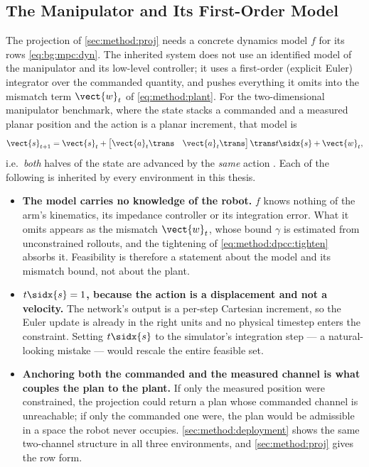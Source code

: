 \subsection{The Manipulator and Its First-Order Model}\label{sec:method:manipulator}

The projection of \autoref{sec:method:proj} needs a concrete dynamics model $f$ for its rows
\eqref{eq:bg:mpc:dyn}. The inherited system does not use an identified
model of the manipulator and its low-level controller; it uses a first-order (explicit Euler)
integrator over the commanded quantity, and pushes everything it omits into the mismatch term
$\vect{w}_{t}$ of \eqref{eq:method:plant}. For the two-dimensional manipulator benchmark, where the
state stacks a commanded and a measured planar position and the action is a planar increment, that
model is
\begin{equation}\label{eq:method:dpcc:euler}
  \vect{s}_{t+1}
  = \vect{s}_{t} + \begin{bmatrix}\vect{a}_{t}\trans & \vect{a}_{t}\trans\end{bmatrix}\trans t\sidx{s}
    + \vect{w}_{t},
\end{equation}
i.e.\ \emph{both} halves of the state are advanced by the \emph{same} action
\parencite[Sec.~6.1]{romer2025diffusion}. Each of the following is inherited by every
environment in this thesis.

\begin{itemize}
  \item \textbf{The model carries no knowledge of the robot.} $f$ knows nothing of the arm's
    kinematics, its impedance controller or its integration error. What it omits appears as the
    mismatch $\vect{w}_{t}$, whose bound $\gamma$ is estimated from unconstrained rollouts, and the
    tightening of \eqref{eq:method:dpcc:tighten} absorbs it. Feasibility is therefore a statement
    about the model and its mismatch bound, not about the plant.
  \item \textbf{$t\sidx{s} = 1$, because the action is a displacement and not a velocity.} The
    network's output is a per-step Cartesian increment, so the Euler update is already in the right
    units and no physical timestep enters the constraint. Setting $t\sidx{s}$ to the simulator's
    integration step --- a natural-looking mistake --- would rescale the entire feasible set.
  \item \textbf{Anchoring both the commanded and the measured channel is what couples the plan to
    the plant.} If only the measured position were constrained, the projection could return a plan
    whose commanded channel is unreachable; if only the commanded one were, the plan would be
    admissible in a space the robot never occupies. \autoref{sec:method:deployment} shows the same
    two-channel structure in all three environments, and \autoref{sec:method:proj} gives the row form.
\end{itemize}

